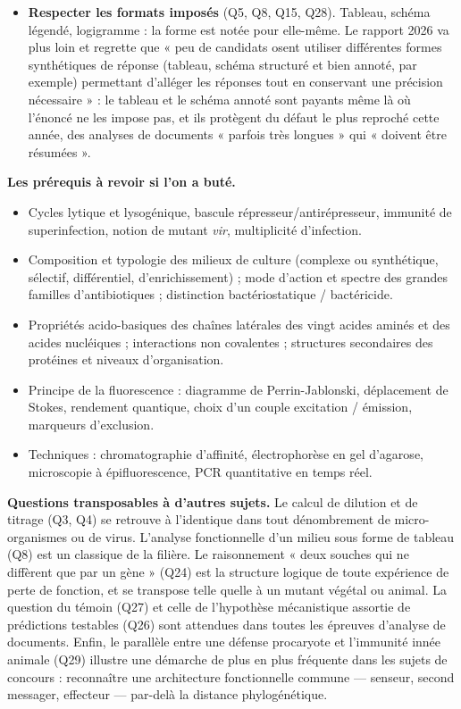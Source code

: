 \documentclass[11pt,a4paper]{article}
\providecommand{\tightlist}{\setlength{\itemsep}{0pt}\setlength{\parskip}{0pt}}
\begin{document}
\begin{itemize}
  \textbf{Confronter deux documents en repérant leur échelle d'observation} (Q24, Q25). Une courbe de survie mesure une population, une image montre des cellules individuelles : une contradiction apparente entre les deux se résout presque toujours ainsi.
\item
  \textbf{Respecter les formats imposés} (Q5, Q8, Q15, Q28). Tableau, schéma légendé, logigramme : la forme est notée pour elle-même. Le rapport 2026 va plus loin et regrette que « peu de candidats osent utiliser différentes formes synthétiques de réponse (tableau, schéma structuré et bien annoté, par exemple) permettant d'alléger les réponses tout en conservant une précision nécessaire » : le tableau et le schéma annoté sont payants même là où l'énoncé ne les impose pas, et ils protègent du défaut le plus reproché cette année, des analyses de documents « parfois très longues » qui « doivent être résumées ».
\end{itemize}

\textbf{Les prérequis à revoir si l'on a buté.}

\begin{itemize}
\tightlist
\item
  Cycles lytique et lysogénique, bascule répresseur/antirépresseur, immunité de superinfection, notion de mutant \emph{vir}, multiplicité d'infection.
\item
  Composition et typologie des milieux de culture (complexe ou synthétique, sélectif, différentiel, d'enrichissement) ; mode d'action et spectre des grandes familles d'antibiotiques ; distinction bactériostatique / bactéricide.
\item
  Propriétés acido-basiques des chaînes latérales des vingt acides aminés et des acides nucléiques ; interactions non covalentes ; structures secondaires des protéines et niveaux d'organisation.
\item
  Principe de la fluorescence : diagramme de Perrin-Jablonski, déplacement de Stokes, rendement quantique, choix d'un couple excitation / émission, marqueurs d'exclusion.
\item
  Techniques : chromatographie d'affinité, électrophorèse en gel d'agarose, microscopie à épifluorescence, PCR quantitative en temps réel.
\end{itemize}

\textbf{Questions transposables à d'autres sujets.} Le calcul de dilution et de titrage (Q3, Q4) se retrouve à l'identique dans tout dénombrement de micro-organismes ou de virus. L'analyse fonctionnelle d'un milieu sous forme de tableau (Q8) est un classique de la filière. Le raisonnement « deux souches qui ne diffèrent que par un gène » (Q24) est la structure logique de toute expérience de perte de fonction, et se transpose telle quelle à un mutant végétal ou animal. La question du témoin (Q27) et celle de l'hypothèse mécanistique assortie de prédictions testables (Q26) sont attendues dans toutes les épreuves d'analyse de documents. Enfin, le parallèle entre une défense procaryote et l'immunité innée animale (Q29) illustre une démarche de plus en plus fréquente dans les sujets de concours : reconnaître une architecture fonctionnelle commune --- senseur, second messager, effecteur --- par-delà la distance phylogénétique.
\end{document}

